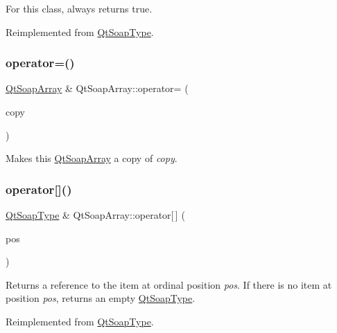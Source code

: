 For this class, always returns true. 

Reimplemented from \mbox{\hyperlink{class_qt_soap_type_a3b659f89a768ca3503fc86086bb987f6}{Qt\+Soap\+Type}}.

\mbox{\label{class_qt_soap_array_af9e4c68154b3e3a2a60ec2b5c57643bc}} 
\subsubsection{\texorpdfstring{operator=()}{operator=()}}
{\footnotesize\ttfamily \mbox{\hyperlink{class_qt_soap_array}{Qt\+Soap\+Array}} \& Qt\+Soap\+Array\+::operator= (\begin{DoxyParamCaption}\item[{const \mbox{\hyperlink{class_qt_soap_array}{Qt\+Soap\+Array}} \&}]{copy }\end{DoxyParamCaption})}

Makes this \mbox{\hyperlink{class_qt_soap_array}{Qt\+Soap\+Array}} a copy of {\itshape copy}. \mbox{\label{class_qt_soap_array_a52701f0a8b5554e9cd51675d6b86ed00}} 
\subsubsection{\texorpdfstring{operator[]()}{operator[]()}\hspace{0.1cm}{\footnotesize\ttfamily [1/6]}}
{\footnotesize\ttfamily \mbox{\hyperlink{class_qt_soap_type}{Qt\+Soap\+Type}} \& Qt\+Soap\+Array\+::operator\mbox{[}$\,$\mbox{]} (\begin{DoxyParamCaption}\item[{int}]{pos }\end{DoxyParamCaption})\hspace{0.3cm}{\ttfamily [virtual]}}

Returns a reference to the item at ordinal position {\itshape pos}. If there is no item at position {\itshape pos}, returns an empty \mbox{\hyperlink{class_qt_soap_type}{Qt\+Soap\+Type}}. 

Reimplemented from \mbox{\hyperlink{class_qt_soap_type_a3b8735f02d9628294bb3f2c6f4fbae20}{Qt\+Soap\+Type}}.

